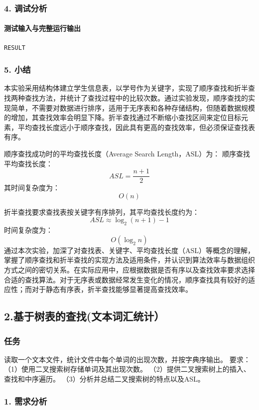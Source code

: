 \documentclass{ctexart}
\begin{document}
\subsubsection{4. 调试分析}
\paragraph{测试输入与完整运行输出}
\begin{verbatim}
RESULT
\end{verbatim}

\subsubsection{5. 小结}
本实验采用结构体建立学生信息表，以学号作为关键字，实现了顺序查找和折半查找两种查找方法，并统计了查找过程中的比较次数。通过实验发现，顺序查找的实现简单，不需要对数据进行排序，适用于无序表和各种存储结构，但随着数据规模的增加，其查找效率会明显下降。折半查找通过不断缩小查找区间来定位目标元素，平均查找长度远小于顺序查找，因此具有更高的查找效率，但必须保证查找表有序。



顺序查找成功时的平均查找长度（Average Search Length，ASL）为：
顺序查找平均查找长度：
$$
ASL = \frac{n+1}{2}
$$
其时间复杂度为：
$$
O(n)
$$

折半查找要求查找表按关键字有序排列，其平均查找长度约为：
$$
ASL \approx \log_2(n+1)-1
$$
时间复杂度为：
$$
O(\log_2 n)
$$
通过本次实验，加深了对查找表、关键字、平均查找长度（ASL）等概念的理解，掌握了顺序查找和折半查找的实现方法及适用条件，并认识到算法效率与数据组织方式之间的密切关系。在实际应用中，应根据数据是否有序以及查找效率要求选择合适的查找算法。对于无序表或数据经常发生变化的情况，顺序查找具有较好的适应性；而对于静态有序表，折半查找能够显著提高查找效率。

\subsection {2.基于树表的查找(文本词汇统计）}
\subsubsection {任务}
读取一个文本文件，统计文件中每个单词的出现次数，并按字典序输出。
要求：
（1）使用二叉搜索树存储单词及其出现次数。
（2）提供二叉搜索树上的插入、查找和中序遍历。
（3）分析并总结二叉搜索树的特点以及ASL。
\subsubsection{1. 需求分析}
\end{document}
